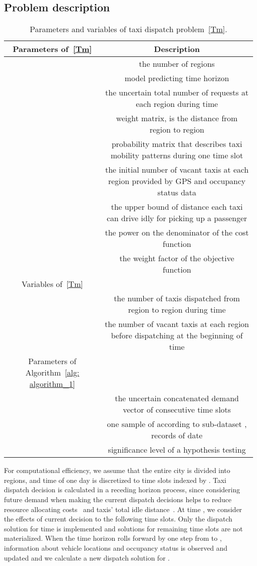\documentclass[10pt,twocolumn,twoside,english]{IEEEtran}
\begin{document}
\subsection{Problem description}
\label{network_model}
\begin{table*}
\centering
\begin{tabular}{|c|c|}
  \hline
  Parameters of~\eqref{Tm}&Description \\ \hline
 & the number of regions\\ \hline    
   & model predicting time horizon\\ \hline   
    & the uncertain total number of requests at each region during time  \\ \hline
    & weight matrix,  is the distance from region  to region   \\ \hline
    & probability matrix that describes taxi mobility patterns during one time slot\\ \hline  & the initial number of vacant taxis at each region provided by GPS and occupancy status data\\ \hline
    & the upper bound of distance each taxi can drive idly for picking up a passenger \\ \hline
 & the power on the denominator of the cost function \\ \hline
    & the weight factor of the objective function \\ \hline  
Variables of~\eqref{Tm}&      \\ \hline    
       &  the number of taxis dispatched from region  to region  during time \\ \hline     
       & the number of vacant taxis at each region before dispatching at the beginning of time  \\ \hline
       Parameters of Algorithm~\ref{alg: algorithm_1}&          \\ \hline  
 & the uncertain concatenated demand vector of  consecutive time slots\\ \hline
 & one sample of  according to sub-dataset , records of date  \\\hline
 & significance level of a hypothesis testing \\ \hline
\end{tabular}
\caption{Parameters and variables of taxi dispatch problem~\eqref{Tm}.}
\label{T1_parameter}
\vspace{-22pt}
\end{table*} 

For computational efficiency, we assume that the entire city is divided into  regions, and time of one day is discretized to time slots indexed by . Taxi dispatch decision is calculated in a receding horizon process, since considering future demand when making the current dispatch decisions helps to reduce resource allocating costs~\cite{mod} and taxis' total idle distance~\cite{Miao_tase16}. At time , we consider the effects of current decision to the following  time slots. Only the dispatch solution for time  is implemented and solutions for remaining time slots are not materialized. When the time horizon rolls forward by one step from  to , information about vehicle locations and occupancy status is observed and updated and we calculate a new dispatch solution for . 
\end{document}
